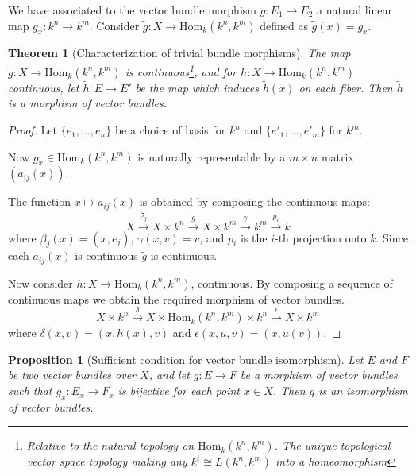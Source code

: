 \documentclass[12pt]{report}
\numberwithin{equation}{section}
\newcommand{\Hom}{{\mathrm{Hom}}}
\newtheorem{theorem}[dummy]{Theorem}
\newtheorem{proposition}[dummy]{Proposition}
\begin{document}
	We have associated to the vector bundle morphism $g: E_1 \to E_2$ a natural linear map $g_x: k^n \to k^m$. Consider $\widetilde{g}: X \to \Hom_k(k^n, k^m)$ defined as $\widetilde{g}(x)=g_x.$
	\begin{theorem}[Characterization of trivial bundle morphisms]\label{thtrivialbundlemorphisms}
		The map $\tilde{g}: X \to \text{Hom}_k(k^n, k^m)$ is continuous\footnote{Relative to the natural topology on $\text{Hom}_k(k^n, k^m)$. The unique topological vector space topology making any $k^t \cong L(k^n,k^m)$ into a homeomorphism}, and for ${h}: X \to \text{Hom}_k(k^n, k^m)$ continuous, let $\tilde{h}: E \to E'$ be the map which induces $\tilde{h}(x)$ on each fiber. Then $\tilde{h}$ is a morphism of vector bundles.
	\end{theorem}
	\begin{proof}
		Let $\{e_1, \dots, e_n\}$ be a choice of basis for $k^n$ and $\{e'_1, \dots, e'_m\}$ for $k^m$.  
		
		Now ${g}_x \in \text{Hom}_k(k^n, k^m)$ is naturally representable by a $m\times n$ matrix $(a_{ij}(x))$.
		
		The function $x \mapsto a_{ij}(x)$ is obtained by composing the continuous maps:
		\[ X \xrightarrow{\beta_j} X \times k^n \xrightarrow{g} X \times k^m \xrightarrow{\gamma} k^m \xrightarrow{p_i} k \]
		where $\beta_j(x) = (x, e_j)$, $\gamma(x, v) = v$, and $p_i$ is the $i$-th projection onto $k$. Since each $a_{ij}(x)$ is continuous $\tilde{g}$ is continuous.
		
		Now consider ${h}: X \to \text{Hom}_k(k^n, k^m)$, continuous. By composing a sequence of continuous maps we obtain the required morphism of vector bundles.
		\[ X \times k^n \xrightarrow{\delta} X \times \text{Hom}_k(k^n, k^m) \times k^n \xrightarrow{\epsilon} X \times k^m \]
		where $\delta(x, v) = (x, {h}(x), v)$ and $\epsilon(x, u, v) = (x, u(v))$.
	\end{proof}

	\begin{proposition}[Sufficient condition for vector bundle isomorphism]\label{propsciso}
	Let $E$ and $F$ be two vector bundles over $X$, and let $g: E \to F$ be a morphism of vector bundles such that $g_x: E_x \to F_x$ is bijective for each point $x \in X$. Then $g$ is an isomorphism of vector bundles.
	\end{proposition}
	
\end{document}
